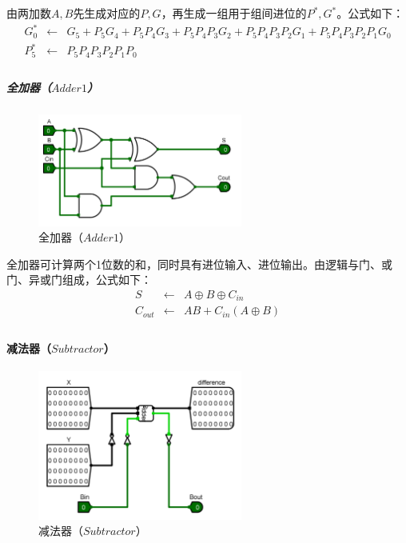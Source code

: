 \documentclass[main.tex]{subfiles}
\begin{document}
由两加数$A, B$先生成对应的$P, G$，再生成一组用于组间进位的$P^*, G^*$。公式如下：
$$
\begin{array}{rcl}
G_0^* &\leftarrow& G_5+P_5G_4+P_5P_4G_3+P_5P_4P_3G_2+P_5P_4P_3P_2G_1+P_5P_4P_3P_2P_1G_0 \\
P_5^* &\leftarrow& P_5P_4P_3P_2P_1P_0 \\
\end{array}
$$

\subparagraph{全加器（$Adder1$）}

\begin{figure}[H]
\centering
\includegraphics[width=0.6\textwidth]{images/Adder1-circuit.png}
\caption{全加器（$Adder1$）}
\end{figure}

全加器可计算两个1位数的和，同时具有进位输入、进位输出。由逻辑与门、或门、异或门组成，公式如下：
$$
\begin{array}{rcl}
S &\leftarrow& A \oplus B \oplus C_{in} \\
C_{out} &\leftarrow& AB + C_{in}\left( A\oplus B\right) \\
\end{array}
$$

\paragraph{减法器（$Subtractor$）}

\begin{figure}[H]
\centering
\includegraphics[width=0.6\textwidth]{images/Substractor-circuit.png}
\caption{减法器（$Subtractor$）}
\end{figure}
\end{document}
